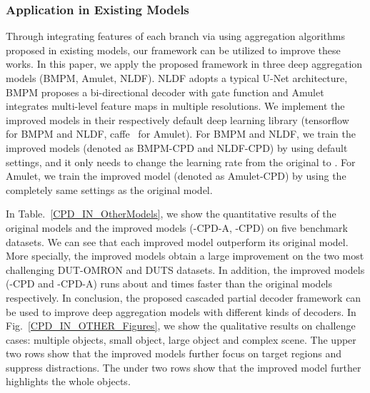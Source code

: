 \documentclass[10pt,twocolumn,letterpaper]{article}
\begin{document}
\subsubsection{Application in Existing Models}
Through integrating features of each branch via using aggregation algorithms proposed in existing models, our framework can be utilized to improve these works. In this paper, we apply the proposed framework in three deep aggregation models (BMPM, Amulet, NLDF). NLDF adopts a typical U-Net architecture, BMPM proposes a bi-directional decoder with gate function and Amulet integrates multi-level feature maps in multiple resolutions. We implement the improved models in their respectively default deep learning library (tensorflow~\cite{Tensorflow} for BMPM and NLDF, caffe~\cite{Caffe} for Amulet). For BMPM and NLDF, we train the improved models (denoted as BMPM-CPD and NLDF-CPD) by using default settings, and it only needs to change the learning rate from the original  to . For Amulet, we train the improved model (denoted as Amulet-CPD) by using the completely same settings as the original model.

In Table.~\ref{CPD_IN_OtherModels}, we show the quantitative results of the original models and the improved models (-CPD-A, -CPD) on five benchmark datasets. We can see that each improved model outperform its original model. More specially, the improved models obtain a large improvement on the two most challenging DUT-OMRON and DUTS datasets. In addition, the improved models (-CPD and -CPD-A) runs about  and  times faster than the original models respectively. In conclusion, the proposed cascaded partial decoder framework can be used to improve deep aggregation models with different kinds of decoders. In Fig.~\ref{CPD_IN_OTHER_Figures}, we show the qualitative results on challenge cases: multiple objects, small object, large object and complex scene. The upper two rows show that the improved models further focus on target regions and suppress distractions. The under two rows show that the improved model further highlights the whole objects.
\end{document}
